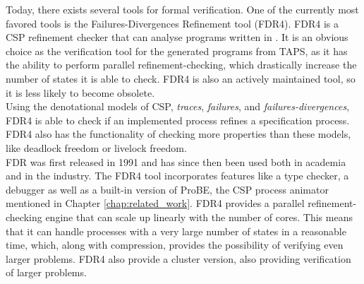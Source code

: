 Today, there exists several tools for formal verification. One of the currently most favored tools is the Failures-Divergences Refinement tool (FDR4). FDR4 is a CSP refinement checker that can analyse programs written in \cspm{}.
It is an obvious choice as the verification tool for the generated \cspm{} programs from TAPS, as it has the ability to perform parallel refinement-checking, which drastically increase the number of states it is able to check. FDR4 is also an actively maintained tool, so it is less likely to become obsolete.\\

 Using the denotational models of CSP, \textit{traces}, \textit{failures}, and \textit{failures-divergences}, FDR4 is able to check if an implemented process refines a specification process. FDR4 also has the functionality of checking more properties than these models, like deadlock freedom or livelock freedom.\\

FDR was first released in 1991 and has since then been used both in academia and in the industry. The FDR4 tool incorporates features like a \cspm{} type checker, a debugger as well as a built-in version of ProBE, the CSP process animator mentioned in Chapter \ref{chap:related_work}. FDR4 provides a parallel refinement-checking engine that can scale up linearly with the number of cores. This means that it can handle processes with a very large number of states in a reasonable time, which, along with compression, provides the possibility of verifying even larger problems. FDR4 also provide a cluster version, also providing verification of larger problems.\\

